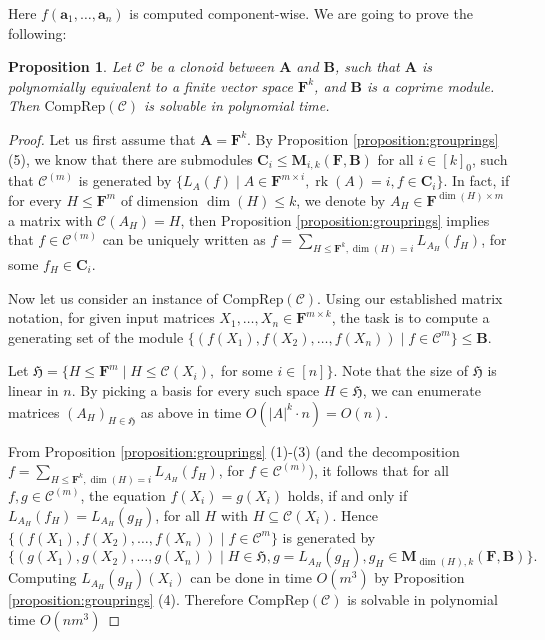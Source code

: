 \documentclass[11pt]{amsart}
\theoremstyle{plain}
\newtheorem{proposition}[thm]{Proposition}
\theoremstyle{definition}
\newcommand{\F}{{\mathbf F}}
\newcommand{\alg}[1]{\mathbf{#1}}
\newcommand{\clone}[1]{\mathcal{#1}}
\newcommand{\clonoid}[1]{\mathcal{#1}}
\newcommand{\clodC}{\clonoid{C}}
\newcommand{\algA}{\alg{A}}
\newcommand{\algB}{\alg{B}}
\newcommand{\algC}{\alg{C}}
\newcommand{\algM}{\alg{M}}
\newcommand{\cloC}{\clone{C}}
\renewcommand\vec{\mathbf}
\newcommand{\va}{\vec{a}}
\DeclareMathOperator{\rk}{rk}
\newcommand{\Col}[1]{\mathcal{C}(#1)}
\begin{document}
Here $f(\va_1,\ldots,\va_n)$ is computed component-wise. We are going to prove the following:

\begin{proposition} \label{prop:SMP}
Let $\cloC$ be a clonoid between $\algA$ and $\algB$, such that $\algA$ is polynomially equivalent to a finite vector space $\F^k$, and $\algB$ is a coprime module. Then $\mathrm{CompRep}(\clodC)$ is solvable in polynomial time.
\end{proposition}

\begin{proof}
Let us first assume that $\algA = \F^k$. By Proposition \ref{proposition:grouprings} (5), we know that there are submodules $\algC_i \leq \algM_{i,k}(\F,\algB)$ for all $i \in [k]_0$, such that $\clodC^{(m)}$ is generated by $\{L_A(f) \mid A \in \F^{m\times i}, \rk(A) = i, f \in \algC_i \}$. In fact, if for every $H \leq \F^m$ of dimension $\dim(H)\leq k$, we denote by $A_H \in \F^{\dim{(H)}\times m}$ a matrix with $\Col{A_H} =H$, then Proposition \ref{proposition:grouprings} implies that $f \in \clodC^{(m)}$ can be uniquely written as $f = \sum_{H\leq \F^k, \dim(H) =i} L_{A_H}(f_H)$, for some $f_H \in \algC_i$.

Now let us consider an instance of $\mathrm{CompRep}(\clodC)$. Using our established matrix notation, for given input matrices $X_1,\ldots,X_n \in \F^{m\times k}$, the task is to compute a generating set of the module $\{(f(X_1),f(X_2),\ldots,f(X_n)) \mid f \in \clodC^{m}\} \leq \algB$.

Let $\mathfrak H = \{H\leq \F^m \mid H \leq \Col{X_i},$ for some $ i \in [n]\}$. Note that the size of $\mathfrak H$ is linear in $n$. By picking a basis for every such space $H \in \mathfrak H$, we can enumerate matrices $(A_H)_{H \in \mathfrak H}$ as above in time $O(|A|^k \cdot n) = O(n)$.

From Proposition \ref{proposition:grouprings} (1)-(3) (and the decomposition $f = \sum_{H\leq \F^k, \dim(H) =i} L_{A_H}(f_H)$, for $f\in \clodC^{(m)}$), it follows that for all $f,g\in \cloC^{(m)}$, the equation $f(X_i) = g(X_i)$ holds, if and only if $L_{A_H}(f_H) = L_{A_H}(g_H)$, for all $H$ with $H \subseteq \Col{X_i}$. Hence $\{(f(X_1),f(X_2),\ldots,f(X_n)) \mid f \in \clodC^{m}\} $ is generated by $$\{(g(X_1),g(X_2),\ldots,g(X_n)) \mid H \in \mathfrak H, g = L_{A_H}(g_H),  g_H \in \algM_{\dim(H),k}(\F,\algB) \}.$$ Computing $L_{A_H}(g_H)(X_i)$ can be done in time $O(m^3)$ by Proposition \ref{proposition:grouprings} (4). Therefore $\mathrm{CompRep}(\clodC)$ is solvable in polynomial time $O(nm^3)$


\end{proof}
\end{document}
